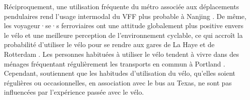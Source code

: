 \begin{refsegment}
Réciproquement, une utilisation fréquente du métro associée aux déplacements pendulaires rend l'usage intermodal du \acrshort{VFF} plus probable à Nanjing \textcolor{blue}{\autocite[13]{liu_use_2020}}. De même, les voyageur·se·s ferroviaires ont une attitude globalement plus positive envers le vélo et une meilleure perception de l'environnement cyclable, ce qui accroît la probabilité d'utiliser le vélo pour se rendre aux gares de La Haye et de Rotterdam \textcolor{blue}{\autocite[497]{la_paix_puello_role_2021}}. Les personnes habituées à utiliser le vélo tendent à vivre dans des ménages fréquentant régulièrement les transports en commun à Portland \textcolor{blue}{\autocite[101]{singleton_exploring_2014}}. Cependant, \textcolor{blue}{\textcite[94]{taylor_analysis_1996}} soutiennent que les habitudes d'utilisation du vélo, qu'elles soient régulières ou occasionnelles, en association avec le bus au Texas, ne sont pas influencées par l'expérience passée avec le vélo.%


\end{refsegment}

